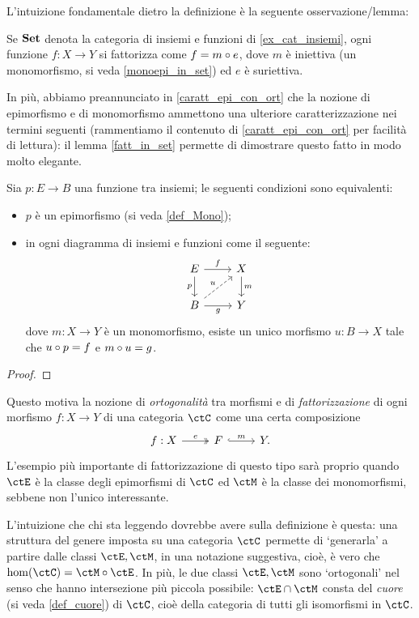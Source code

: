 \medskip
L'intuizione fondamentale dietro la definizione è la seguente osservazione/lemma:
\begin{lemma}\label{fatt_in_set}
	Se \(\mathbf{Set}\) denota la categoria di insiemi e funzioni di \ref{ex_cat_insiemi}, ogni funzione \(f : X \to Y\) si fattorizza come \(f = m \circ e\), dove \(m\) è iniettiva (un monomorfismo, si veda \ref{monoepi_in_set}) ed \(e\) è suriettiva.%
\end{lemma}
In più, abbiamo preannunciato in \ref{caratt_epi_con_ort} che la nozione di epimorfismo e di monomorfismo ammettono una ulteriore caratterizzazione nei termini seguenti (rammentiamo il contenuto di \ref{caratt_epi_con_ort} per facilità di lettura): il lemma \ref{fatt_in_set} permette di dimostrare questo fatto in modo molto elegante.
\begin{proposition*}
	Sia \(p : E \to B\) una funzione tra insiemi; le seguenti condizioni sono equivalenti:
	\begin{itemize}
		\item \(p\) è un epimorfismo (si veda \ref{def_Mono});
		\item in ogni diagramma di insiemi e funzioni come il seguente:
		      \[\begin{tikzcd}
				      E \ar[r, "f"]\ar[d, "p"']& X \ar[d, "m"]\\
				      B \ar[r, "g"'] \ar[ur, dashed, "u"]& Y
			      \end{tikzcd}\]
		      dove \(m : X\to Y\) è un monomorfismo, esiste un unico morfismo \(u : B\to X\) tale che \(u\circ p = f\) e \(m\circ u = g\).
	\end{itemize}
\end{proposition*}
\begin{proof}
	\Todo{}
\end{proof}
Questo motiva la nozione di \emph{ortogonalità} tra morfismi e di \emph{fattorizzazione} di ogni morfismo \(f : X\to Y\) di una categoria \(\ctC\) come una certa composizione
\[
	\begin{tikzcd}
		f : X \ar[r, "e", two heads]& F \ar[r, "m", hook] & Y.
	\end{tikzcd}
\]
L'esempio più importante di fattorizzazione di questo tipo sarà proprio quando \(\ctE\) è la classe degli epimorfismi di \(\ctC\) ed \(\ctM\) è la classe dei monomorfismi, sebbene non l'unico interessante.

L'intuizione che chi sta leggendo dovrebbe avere sulla definizione è questa: una struttura del genere imposta su una categoria \(\ctC\) permette di `generarla' a partire dalle classi \(\ctE,\ctM\), in una notazione suggestiva, cioè, è vero che \(\hom(\ctC) = \ctM\cmp \ctE\). In più, le due classi \(\ctE,\ctM\) sono `ortogonali' nel senso che hanno intersezione più piccola possibile: \(\ctE\cap \ctM\) consta del \emph{cuore} (si veda \ref{def_cuore}) di \(\ctC\), cioè della categoria di tutti gli isomorfismi in \(\ctC\).

